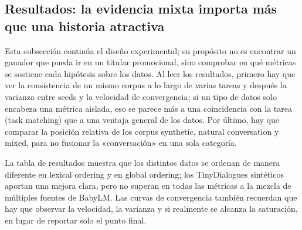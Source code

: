 \subsection{Resultados: la evidencia mixta importa más que una historia atractiva}

Esta subsección continúa el diseño experimental; su propósito no es encontrar un ganador que pueda ir en un titular promocional, sino comprobar en qué métricas se sostiene cada hipótesis sobre los datos. Al leer los resultados, primero hay que ver la consistencia de un mismo corpus a lo largo de varias tareas y después la varianza entre seeds y la velocidad de convergencia; si un tipo de datos solo encabeza una métrica aislada, eso se parece más a una coincidencia con la tarea (task matching) que a una ventaja general de los datos. Por último, hay que comparar la posición relativa de los corpus synthetic, natural conversation y mixed, para no fusionar la «conversación» en una sola categoría.

La tabla de resultados muestra que los distintos datos se ordenan de manera diferente en lexical ordering y en global ordering; los TinyDialogues sintéticos aportan una mejora clara, pero no superan en todas las métricas a la mezcla de múltiples fuentes de BabyLM. Las curvas de convergencia también recuerdan que hay que observar la velocidad, la varianza y si realmente se alcanza la saturación, en lugar de reportar solo el punto final.







